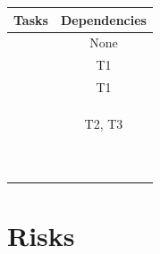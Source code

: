 \documentclass{article}
\begin{document}
\begin{table}[H]
\begin{adjustbox}{width = 1.2\textwidth}
\begin{tabular}{*{2}{c}}
	\toprule
	Tasks & Dependencies \\
	\midrule
	[T1] & None\\
	[T2] & T1\\
	[T3] & T1\\
	[T4] & \\
	[T5] & \\
	[T6] & \\
	[T7] & T2, T3\\
	[T8] & \\
	[T9] & \\
	[T10] & \\
	[T11] & \\
	[T12] & \\
	[T13] & \\
	[T14] & \\
	[T15] & \\
	[T16] & \\
	[T17] & \\
\end{tabular}
\end{adjustbox}
\end{table}







\section{Risks}
\end{document}
